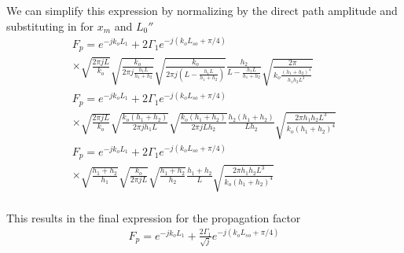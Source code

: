 We can simplify this expression by normalizing by the direct path amplitude and substituting in for $x_m$ and $L_0''$
\begin{equation}
\begin{gathered}
F_p= e^{-jk_oL_1}+ 2\Gamma_1e^{-j\left(k_oL_{so}+\pi/4\right)}\\ \times \sqrt{\frac{2\pi j L}{k_o}} \sqrt{\frac{k_o}{2\pi j\frac{h_1L}{h_1+h_2}}}\sqrt{\frac{k_o}{2\pi j (L-\frac{h_1L}{h_1+h_2})}}\frac{h_2}{L-\frac{h_1L}{h_1+h_2}}\sqrt{\frac{2\pi}{k_o\frac{(h_1+h_2)^4}{h_1h_2L^3}}} \\
F_p= e^{-jk_oL_1}+ 2\Gamma_1e^{-j\left(k_oL_{so}+\pi/4\right)}\\ \times \sqrt{\frac{2\pi j L}{k_o}} \sqrt{\frac{k_o(h_1+h_2)}{2\pi jh_1L}}\sqrt{\frac{k_o(h_1+h_2)}{2\pi jLh_2}}\frac{h_2(h_1+h_2)}{Lh_2}\sqrt{\frac{2\pi h_1h_2L^3}{k_o(h_1+h_2)^4}} \\
F_p= e^{-jk_oL_1}+ 2\Gamma_1e^{-j\left(k_oL_{so}+\pi/4\right)}\\ \times  \sqrt{\frac{h_1+h_2}{h_1}}\sqrt{\frac{k_o}{2\pi j L}}\sqrt{\frac{h_1+h_2}{h_2}}\frac{h_1+h_2}{L}\sqrt{\frac{2\pi h_1h_2L^3}{k_o(h_1+h_2)^4}} \\
\end{gathered}
\label{mp_eq:27}
\end{equation}

This results in the final expression for the propagation factor
\begin{equation}
\begin{gathered}
\boxed{F_p= e^{-jk_oL_1}+ \frac{2\Gamma_1}{\sqrt{j}}e^{-j\left(k_oL_{so}+\pi/4\right)}}
\end{gathered}
\label{mp_eq:27}
\end{equation}